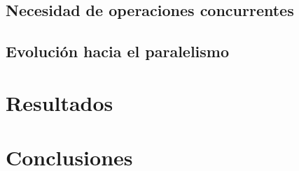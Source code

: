 \documentclass[letterpaper,12pt,oneside]{book}
\begin{document}
	\section{Necesidad de operaciones concurrentes}
	
	 \section{Evolución hacia el paralelismo}

\chapter{Resultados}  %


\chapter{Conclusiones}

%
%

\end{document}
